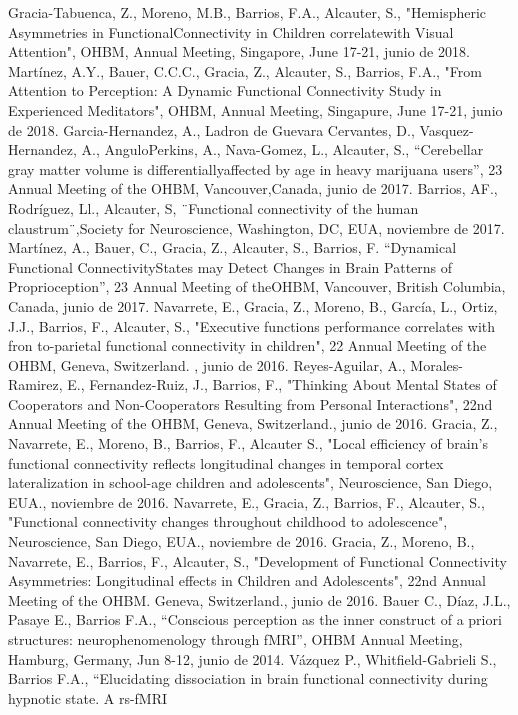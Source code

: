 \documentclass[11pt]{article}
\begin{document}
\begin{enumerate}
Gracia-Tabuenca, Z., Moreno, M.B., Barrios, F.A., Alcauter, S., "Hemispheric Asymmetries in FunctionalConnectivity in Children correlatewith 
Visual Attention", OHBM, Annual Meeting, Singapore, June 17-21,  junio de 2018.
Martínez, A.Y., Bauer, C.C.C., Gracia, Z., Alcauter, S., Barrios, F.A., "From Attention to Perception: A Dynamic Functional Connectivity Study 
in Experienced Meditators", OHBM, Annual Meeting, Singapure, June 17-21,  junio de 2018.
Garcia-Hernandez, A., Ladron de Guevara Cervantes, D., Vasquez-Hernandez, A., AnguloPerkins, A., Nava-Gomez, L., Alcauter, S., “Cerebellar 
gray matter volume is differentiallyaffected by age in heavy marijuana users”, 23 Annual Meeting of the OHBM, Vancouver,Canada,  junio de 
2017.
Barrios, AF., Rodríguez, Ll., Alcauter, S, ¨Functional connectivity of the human claustrum¨,Society for Neuroscience, Washington, DC, EUA,  
noviembre de 2017.
Martínez, A., Bauer, C., Gracia, Z., Alcauter, S., Barrios, F. “Dynamical Functional ConnectivityStates may Detect Changes in Brain Patterns 
of Proprioception”, 23 Annual Meeting of theOHBM, Vancouver, British Columbia, Canada,  junio de 2017.
Navarrete, E., Gracia, Z., Moreno, B., García, L., Ortiz, J.J., Barrios, F., Alcauter, S., "Executive functions performance correlates with 
fron to-parietal functional connectivity in children", 22 Annual Meeting of the OHBM, Geneva, Switzerland. ,  junio de 2016.
Reyes-Aguilar, A., Morales-Ramirez, E., Fernandez-Ruiz, J., Barrios, F., "Thinking About Mental States of Cooperators and Non-Cooperators 
Resulting from Personal Interactions", 22nd Annual Meeting of the OHBM, Geneva, Switzerland.,  junio de 2016.
Gracia, Z., Navarrete, E., Moreno, B., Barrios, F., Alcauter S., "Local efficiency of brain's functional connectivity reflects longitudinal 
changes in temporal cortex lateralization in school-age children and adolescents", Neuroscience, San Diego, EUA.,  noviembre de 2016.
Navarrete, E., Gracia, Z., Barrios, F., Alcauter, S., "Functional connectivity changes throughout childhood to adolescence", Neuroscience, San 
Diego, EUA.,  noviembre de 2016.
Gracia, Z., Moreno, B., Navarrete, E., Barrios, F., Alcauter, S., "Development of Functional Connectivity Asymmetries: Longitudinal effects in 
Children and Adolescents", 22nd Annual Meeting of the OHBM. Geneva, Switzerland.,  junio de 2016.
Bauer C., Díaz, J.L., Pasaye E., Barrios F.A., “Conscious perception as the inner construct of a priori structures: neurophenomenology through 
fMRI”, OHBM Annual Meeting, Hamburg, Germany, Jun 8-12,  junio de 2014.
Vázquez P., Whitfield-Gabrieli S., Barrios F.A., “Elucidating dissociation in brain functional connectivity during hypnotic state. A rs-fMRI 

\end{enumerate}
\end{document}
